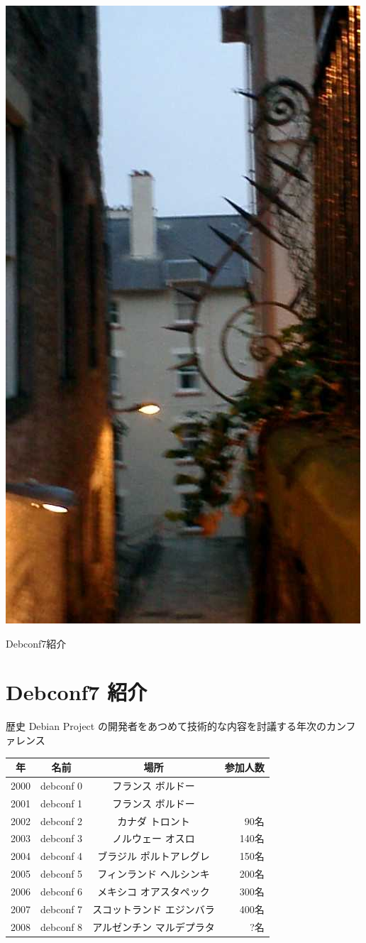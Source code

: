 \documentclass[cjk,dvipdfmx,12pt]{beamer}
\newcommand{\emtext}[1]{
\begin{frame}{}
 
\begin{minipage}{0.55\hsize}
\includegraphics[width=1\hsize]{image200707/gurutitle.jpg}
\end{minipage}
\begin{minipage}{0.39\hsize}
 {\Huge #1
 }
\end{minipage}
\end{frame}
}
\begin{document}
\emtext{Debconf7紹介}

\section{Debconf7 紹介}
\begin{frame}{歴史}
Debian Project の開発者をあつめて技術的な内容を討議する年次のカンファレンス
 \begin{tabular}{|c|c|c|r|}
 \hline
 年 & 名前 & 場所 & 参加人数 \\
 \hline
 2000 & debconf 0 &フランス ボルドー & \\
 2001 & debconf 1 &フランス ボルドー & \\
 2002 & debconf 2 &カナダ トロント & 90名 \\
 2003 & debconf 3 &ノルウェー オスロ & 140名 \\
 2004 & debconf 4 &ブラジル ポルトアレグレ &  150名 \\
 2005 & debconf 5 &フィンランド ヘルシンキ & 200名 \\
 2006 & debconf 6 &メキシコ オアスタペック & 300名 \\
 2007 & debconf 7 &スコットランド エジンバラ & 400名 \\
 2008 & debconf 8 &アルゼンチン マルデプラタ & ?名 \\
 \hline
 \end{tabular}
\end{frame}
\end{document}
